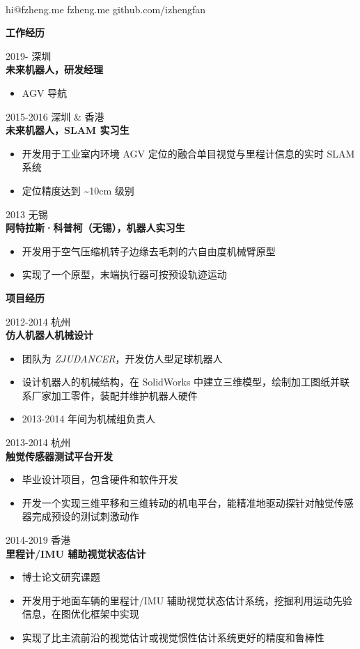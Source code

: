 \documentclass[11pt]{article}
\newcommand{\subsec}[1]{
  \vskip 4pt
  {\bf\large\color{teal}  #1}
  \vskip 1pt
}
\newcommand{\yearspaceevent}[3]{
  {\color{gray} \small #1 \hfill #2}\\
  {\bf #3}
}
\begin{document}

{
   \\
  \faEnvelopeO \space hi@fzheng.me \space\space
  \faLink \space  fzheng.me \space \space 
  \faGithub \space github.com/izhengfan
\par}
\noindent
\begin{minipage}[t]{0.6\textwidth}

  \subsec{工作经历}

  \yearspaceevent{2019-}{深圳 }{未来机器人，研发经理}
  \begin{itemize}
    \item AGV 导航
  \end{itemize}

  \yearspaceevent{2015-2016}{深圳 \& 香港}{未来机器人，SLAM 实习生}
  \begin{itemize}
    \item 开发用于工业室内环境 AGV 定位的融合单目视觉与里程计信息的实时 SLAM 系统
    \item 定位精度达到 \~{}10cm 级别
  \end{itemize}

  \yearspaceevent{2013}{无锡}{阿特拉斯·科普柯（无锡），机器人实习生}
  \begin{itemize}
    \item 开发用于空气压缩机转子边缘去毛刺的六自由度机械臂原型
    \item 实现了一个原型，末端执行器可按预设轨迹运动
  \end{itemize}

  \subsec{项目经历}
  \yearspaceevent{2012-2014}{杭州}{仿人机器人机械设计}
  \begin{itemize}
    \item 团队为 \emph{ZJUDANCER}，开发仿人型足球机器人
    \item 设计机器人的机械结构，在 SolidWorks 中建立三维模型，绘制加工图纸并联系厂家加工零件，装配并维护机器人硬件
    \item 2013-2014 年间为机械组负责人
  \end{itemize}
  \yearspaceevent{2013-2014}{杭州}{触觉传感器测试平台开发}
  \begin{itemize}
    \item 毕业设计项目，包含硬件和软件开发
    \item 开发一个实现三维平移和三维转动的机电平台，能精准地驱动探针对触觉传感器完成预设的测试刺激动作
  \end{itemize}
  \yearspaceevent{2014-2019}{香港}{里程计/IMU 辅助视觉状态估计}
  \begin{itemize}
    \item 博士论文研究课题
    \item 开发用于地面车辆的里程计/IMU 辅助视觉状态估计系统，挖掘利用运动先验信息，在图优化框架中实现
    \item 实现了比主流前沿的视觉估计或视觉惯性估计系统更好的精度和鲁棒性
  \end{itemize}


\end{minipage}
\end{document}
